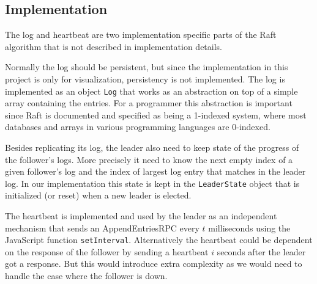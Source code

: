 \subsection{Implementation} %
\label{sub:log_replication_implementation}

The log and heartbeat are two implementation specific parts of the Raft algorithm that is not described in implementation details.

Normally the log should be persistent, but since the implementation in this project is only for visualization, persistency is not implemented. The log is implemented as an object \verb$Log$ that works as an abstraction on top of a simple array containing the entries. For a programmer this abstraction is important since Raft is documented and specified as being a 1-indexed system, where most databases and arrays in various programming languages are 0-indexed.

Besides replicating its log, the leader also need to keep state of the progress of the follower's logs. More precisely it need to know the next empty index of a given follower's log and the index of largest log entry that matches in the leader log. In our implementation this state is kept in the \verb$LeaderState$ object that is initialized (or reset) when a new leader is elected.

The heartbeat is implemented and used by the leader as an independent mechanism that sends an AppendEntriesRPC every $t$ milliseconds using the JavaScript function \verb$setInterval$. Alternatively the heartbeat could be dependent on the response of the follower by sending a heartbeat $i$ seconds after the leader got a response. But this would introduce extra complexity as we would need to handle the case where the follower is down.


